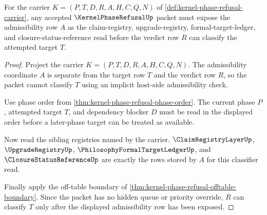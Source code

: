 \begin{theorem}
\label{thm:kernel-phase-refusal-admissibility-obligation}
For the carrier $K=(P,T,D,R,A,H,C,Q,N)$ of \autoref{def:kernel-phase-refusal-carrier}, any accepted $\KernelPhaseRefusalUp$ packet must expose the admissibility row $A$ as the claim-registry, upgrade-registry, formal-target-ledger, and closure-status-reference read before the verdict row $R$ can classify the attempted target $T$.
\end{theorem}
\begin{proof}
Project the carrier $K=(P,T,D,R,A,H,C,Q,N)$. The admissibility coordinate $A$ is separate from the target row $T$ and the verdict row $R$, so the packet cannot classify $T$ using an implicit host-side admissibility check.

Use phase order from \autoref{thm:kernel-phase-refusal-phase-order}. The current phase $P$, attempted target $T$, and dependency blocker $D$ must be read in the displayed order before a later-phase target can be treated as available.

Now read the sibling registries named by the carrier. $\ClaimRegistryLayerUp$, $\UpgradeRegistryUp$, $\PhilosophyFormalTargetLedgerUp$, and $\ClosureStatusReferenceUp$ are exactly the rows stored by $A$ for this classifier read.

Finally apply the off-table boundary of \autoref{thm:kernel-phase-refusal-offtable-boundary}. Since the packet has no hidden queue or priority override, $R$ can classify $T$ only after the displayed admissibility row has been exposed.
\end{proof}

